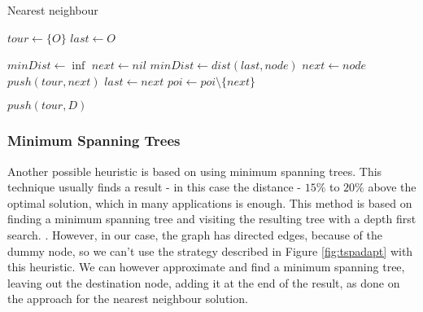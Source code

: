 \documentclass[a4paper, 12pt]{report}
\begin{document}
    \begin{algorithm}
    	\caption{Nearest neighbour} 
	    \begin{algorithmic}[1]
		
		\State $tour \leftarrow \{O\}$
        \State $last \leftarrow O$ 
        
		    \State $minDist \leftarrow \inf$
		    \State $next \leftarrow nil$
                    \State $minDist \leftarrow dist(last, node)$
                    \State $next \leftarrow node$
                \EndIf
		    \EndFor
		    \State $push(tour, next)$
		    \State $last \leftarrow next$
		    \State $poi \leftarrow poi \setminus \{next\}$
		\EndWhile

        \State $push(tour, D)$
		
	    \end{algorithmic} 
	\end{algorithm}
    
    \pagebreak

    
    \subsubsection{Minimum Spanning Trees}
    
    Another possible heuristic is based on using minimum spanning trees. This technique usually finds a result - in this case the distance - $15\%$ to $20\%$ above the optimal solution, which in many applications is enough. This method is based on finding a minimum spanning tree and visiting the resulting tree with a depth first search. \cite{skienna1}. However, in our case, the graph has directed edges, because of the dummy node, so we can't use the strategy described in Figure \ref{fig:tspadapt} with this heuristic. We can however approximate and find a minimum spanning tree, leaving out the destination node, adding it at the end of the result, as done on the approach for the nearest neighbour solution.
    
\end{document}

